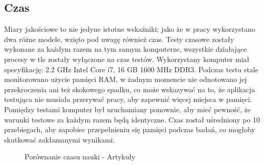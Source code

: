 \subsection{Czas}
Miary jakościowe to nie jedyne istotne wskaźniki; jako że w pracy wykorzystano dwa różne modele, wzięto pod uwagę również czas. Testy czasowe zostały wykonane za każdym razem na tym samym komputerze, wszystkie działające procesy w tle zostały wyłączone na czas testów. Wykorzystany komputer miał specyfikację: 2.2 GHz Intel Core i7, 16 GB 1600 MHz DDR3. Podczas testu stale monitorowano użycie pamięci RAM, w żadnym momencie nie odnotowano jej przekroczenia ani też skokowego spadku, co może wskazywać na to, że aplikacja testująca nie musiała przerywać pracy, aby zapewnić więcej miejsca w pamięci. Pomiędzy testami komputer był uruchamiany ponownie, aby mieć pewność, że warunki testowe za każdym razem będą identyczne. Czas został uśredniony po 10 przebiegach, aby zapobiec przepełnieniu się pamięci podczas badań, co mogłoby skutkować zakłamanymi wynikami.

\newpage
\begin{figure}[ht!]
	\centering
    \qquad
	\caption{Porównanie czasu nauki - Artykuły}
    \label{fig:fit-time-articles}
\end{figure}

